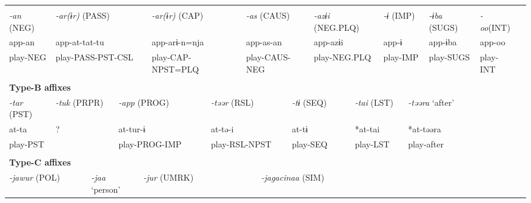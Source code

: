 \tabletail{}
\tablelasttail{}
\begin{tabularx}{\textwidth}{XXXXXXXXXXXXXXXXXXXXXXX}
\lsptoprule
\multicolumn{23}{X}{{\bfseries Type-A affixes}}\\
{ \textit{{}-an} (NEG)} & \multicolumn{6}{X}{{ \textit{{}-ar(ɨr)} (PASS)}} & \multicolumn{3}{X}{{ \textit{{}-ar(ɨr)} (CAP)}} & \multicolumn{4}{X}{{ \textit{{}-as} (CAUS)}} & \multicolumn{4}{X}{{ \textit{{}-azɨi} (NEG.PLQ)}} & \multicolumn{2}{X}{{ \textit{{}-ɨ} (IMP)}} & { \textit{{}-ɨba} (SUGS)} & { \textit{{}-oo}(INT)} & \\
{ app-an} & \multicolumn{6}{X}{{ app-at-tat-tu}} & \multicolumn{3}{X}{{ app-arɨ-n=nja}} & \multicolumn{4}{X}{{ app-as-an}} & \multicolumn{4}{X}{{ app-azɨi}} & \multicolumn{2}{X}{{ app-ɨ}} & { app-ɨba} & { app-oo} & \\
play-NEG & \multicolumn{6}{X}{play-PASS-PST-CSL} & \multicolumn{3}{X}{play-CAP-NPST=PLQ} & \multicolumn{4}{X}{play-CAUS-NEG} & \multicolumn{4}{X}{play-NEG.PLQ} & \multicolumn{2}{X}{play-IMP} & play-SUGS & play-INT & \\
\multicolumn{23}{X}{}\\
\multicolumn{23}{X}{{\bfseries Type-B affixes}}\\
{ \textit{{}-tar} (PST)} & \multicolumn{3}{X}{{ \textit{{}-tuk} (PRPR)}} & \multicolumn{5}{X}{{ \textit{{}-app} (PROG)}} & \multicolumn{4}{X}{{ \textit{{}-təər} (RSL)}} & \multicolumn{3}{X}{{ \textit{{}-tɨ} (SEQ)}} & \multicolumn{3}{X}{{ \textit{{}-tai} (LST)}} & \multicolumn{4}{X}{{ \textit{{}-təəra} ‘after’}}\\
{ at-ta} & \multicolumn{3}{X}{{ ?}} & \multicolumn{5}{X}{{ at-tur-ɨ}} & \multicolumn{4}{X}{{ at-tə-i}} & \multicolumn{3}{X}{{ at-tɨ}} & \multicolumn{3}{X}{{ *at-tai}} & \multicolumn{4}{X}{{ *at-təəra}}\\
play-PST & \multicolumn{3}{X}{} & \multicolumn{5}{X}{play-PROG-IMP} & \multicolumn{4}{X}{play-RSL-NPST} & \multicolumn{3}{X}{play-SEQ} & \multicolumn{3}{X}{play-LST} & \multicolumn{4}{X}{{ play-after}}\\
& \multicolumn{3}{X}{} & \multicolumn{5}{X}{} & \multicolumn{4}{X}{} & \multicolumn{3}{X}{} & \multicolumn{3}{X}{} & \multicolumn{4}{X}{}\\
\multicolumn{23}{X}{{\bfseries Type-C affixes}}\\
\multicolumn{3}{X}{{ \textit{{}-jawur} (POL)}} & \multicolumn{3}{X}{{ \textit{{}-jaa} ‘person’}} & \multicolumn{5}{X}{{ \textit{{}-jur} (UMRK)}} & \multicolumn{4}{X}{{ \textit{{}-jagacinaa} (SIM)}} & \multicolumn{8}{X}{}\\

\end{tabularx}

